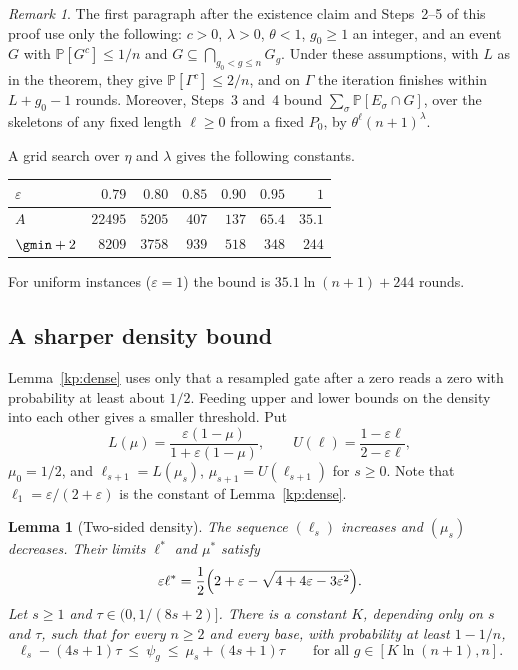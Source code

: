 \documentclass[11pt]{amsart}
\newtheorem{lemma}[theorem]{Lemma}
\theoremstyle{definition}
\theoremstyle{remark}
\newtheorem{remark}[theorem]{Remark}
\newcommand{\eps}{\varepsilon}
\newcommand{\PP}{\mathbb{P}}
\begin{document}
\begin{remark}\label{kp:reuse}
The first paragraph after the existence claim and Steps~2--5 of this proof use
only the following: $c>0$, $\lambda>0$, $\theta<1$, $g_0\ge 1$ an integer, and
an event $G$ with $\PP[G^c]\le 1/n$ and $G\subseteq\bigcap_{g_0<g\le n}G_g$.
Under these assumptions, with $L$ as in the theorem, they give
$\PP[\Gamma^c]\le 2/n$, and on $\Gamma$ the iteration finishes within
$L+g_0-1$ rounds. Moreover, Steps~3 and~4 bound
$\sum_\sigma\PP[E_\sigma\cap G]$, over the skeletons of any fixed length
$\ell\ge 0$ from a fixed $P_0$, by $\theta^\ell(n+1)^\lambda$.
\end{remark}

A grid search over $\eta$ and $\lambda$ gives the following constants.
\begin{center}
\begin{tabular}{lrrrrrr}
\toprule
$\eps$ & $0.79$ & $0.80$ & $0.85$ & $0.90$ & $0.95$ & $1$\\
\midrule
$A$ & $22495$ & $5205$ & $407$ & $137$ & $65.4$ & $35.1$\\
$\gmin+2$ & $8209$ & $3758$ & $939$ & $518$ & $348$ & $244$\\
\bottomrule
\end{tabular}
\end{center}
For uniform instances ($\eps=1$) the bound is $35.1\ln(n+1)+244$ rounds.

\subsection{A sharper density bound}\label{kp:sub-sharper}

Lemma~\ref{kp:dense} uses only that a resampled gate after a zero reads a zero
with probability at least about $1/2$. Feeding upper and lower bounds on the
density into each other gives a smaller threshold. Put
\[
  L(\mu)=\frac{\eps(1-\mu)}{1+\eps(1-\mu)},\qquad
  U(\ell)=\frac{1-\eps\ell}{2-\eps\ell},
\]
$\mu_0=1/2$, and $\ell_{s+1}=L(\mu_s)$, $\mu_{s+1}=U(\ell_{s+1})$ for
$s\ge 0$. Note that $\ell_1=\eps/(2+\eps)$ is the constant of
Lemma~\ref{kp:dense}.

\begin{lemma}[Two-sided density]\label{kp:twosided}
The sequence $(\ell_s)$ increases and $(\mu_s)$ decreases. Their limits $\ell^*$
and $\mu^*$ satisfy
\[
  \eps\ell^*=\frac12\Bigl(2+\eps-\sqrt{4+4\eps-3\eps^2}\Bigr).
\]
Let $s\ge 1$ and $\tau\in(0,1/(8s+2)]$. There is a constant $K$, depending only
on $s$ and $\tau$, such that for every $n\ge 2$ and every base, with
probability at least $1-1/n$,
\[
  \ell_s-(4s+1)\tau\ \le\ \psi_g\ \le\ \mu_s+(4s+1)\tau
  \qquad\text{for all } g\in[K\ln(n+1),n].
\]
\end{lemma}
\end{document}
